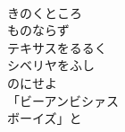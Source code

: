 \documentclass[10pt,b5j]{tarticle} %
\begin{document}
\begin{enumerate}
\begin{minipage}[c]{\blocksize}
    \end{minipage}
    \begin{minipage}[c]{\blocksize}
        
        \vspace{\linespace}
        \item~\\
        きのくところ\\
        ものならず\\
        テキサスをるるく\\
        シベリヤをふし\\
        のにせよ\\
        「ビーアンビシァス\\
        ボーイズ」と
    
    \end{minipage}
\end{enumerate} %
\end{document}
